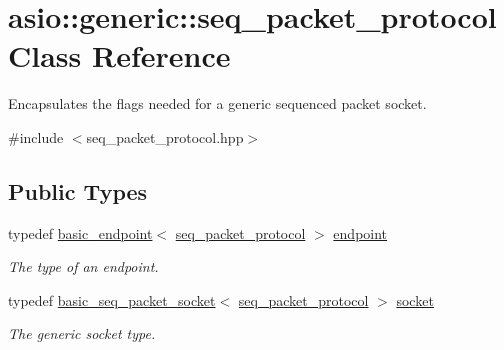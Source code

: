 \hypertarget{classasio_1_1generic_1_1seq__packet__protocol}{}\section{asio\+:\+:generic\+:\+:seq\+\_\+packet\+\_\+protocol Class Reference}
\label{classasio_1_1generic_1_1seq__packet__protocol}


Encapsulates the flags needed for a generic sequenced packet socket.  




{\ttfamily \#include $<$seq\+\_\+packet\+\_\+protocol.\+hpp$>$}

\subsection*{Public Types}
\begin{DoxyCompactItemize}
\item 
typedef \hyperlink{classasio_1_1generic_1_1basic__endpoint}{basic\+\_\+endpoint}$<$ \hyperlink{classasio_1_1generic_1_1seq__packet__protocol}{seq\+\_\+packet\+\_\+protocol} $>$ \hyperlink{classasio_1_1generic_1_1seq__packet__protocol_a61c218617d6ebabb06b8136aab0f9cb7}{endpoint}
\begin{DoxyCompactList}\small\item\em The type of an endpoint. \end{DoxyCompactList}\item 
typedef \hyperlink{classasio_1_1basic__seq__packet__socket}{basic\+\_\+seq\+\_\+packet\+\_\+socket}$<$ \hyperlink{classasio_1_1generic_1_1seq__packet__protocol}{seq\+\_\+packet\+\_\+protocol} $>$ \hyperlink{classasio_1_1generic_1_1seq__packet__protocol_aa9ffbed9ebed0547505737663a1a0a8f}{socket}
\begin{DoxyCompactList}\small\item\em The generic socket type. \end{DoxyCompactList}\end{DoxyCompactItemize}
